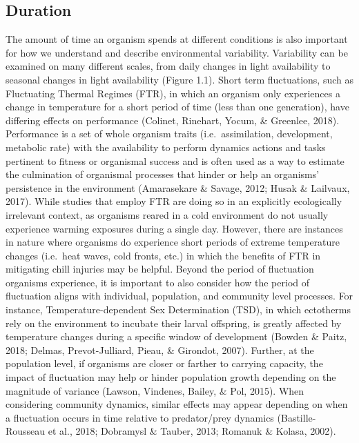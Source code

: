 \documentclass[12pt,twoside]{reedthesis}
\begin{document}
\hypertarget{duration}{%
\subsection{Duration}\label{duration}}

The amount of time an organism spends at different conditions is also important for how we understand and describe environmental variability. Variability can be examined on many different scales, from daily changes in light availability to seasonal changes in light availability (Figure 1.1). Short term fluctuations, such as Fluctuating Thermal Regimes (FTR), in which an organism only experiences a change in temperature for a short period of time (less than one generation), have differing effects on performance (Colinet, Rinehart, Yocum, \& Greenlee, 2018). Performance is a set of whole organism traits (i.e.~assimilation, development, metabolic rate) with the availability to perform dynamics actions and tasks pertinent to fitness or organismal success and is often used as a way to estimate the culmination of organismal processes that hinder or help an organisms' persistence in the environment (Amarasekare \& Savage, 2012; Husak \& Lailvaux, 2017). While studies that employ FTR are doing so in an explicitly ecologically irrelevant context, as organisms reared in a cold environment do not usually experience warming exposures during a single day. However, there are instances in nature where organisms do experience short periods of extreme temperature changes (i.e.~heat waves, cold fronts, etc.) in which the benefits of FTR in mitigating chill injuries may be helpful. Beyond the period of fluctuation organisms experience, it is important to also consider how the period of fluctuation aligns with individual, population, and community level processes. For instance, Temperature-dependent Sex Determination (TSD), in which ectotherms rely on the environment to incubate their larval offspring, is greatly affected by temperature changes during a specific window of development (Bowden \& Paitz, 2018; Delmas, Prevot-Julliard, Pieau, \& Girondot, 2007). Further, at the population level, if organisms are closer or farther to carrying capacity, the impact of fluctuation may help or hinder population growth depending on the magnitude of variance (Lawson, Vindenes, Bailey, \& Pol, 2015). When considering community dynamics, similar effects may appear depending on when a fluctuation occurs in time relative to predator/prey dynamics (Bastille-Rousseau et al., 2018; Dobramysl \& Tauber, 2013; Romanuk \& Kolasa, 2002).
\end{document}
